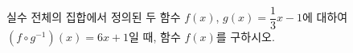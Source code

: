 \hspace*{2mm}\begin{minipage}[t]{\dimexpr\linewidth-2mm\relax}\vspace{0pt}
실수 전체의 집합에서 정의된 두 함수 $f(x)$, $g(x)=\dfrac{1}{3}x-1$에 대하여 $(f\circ g^{-1})(x)=6x+1$일 때, 함수 $f(x)$를 구하시오.\end{minipage}
